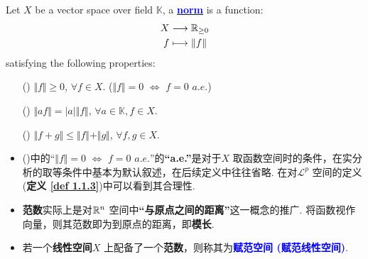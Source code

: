 	\begin{defn}\label{def 1.1.1}
		Let $X$ be a vector space over field $\mathbb{K}$, a \underline{\textcolor{blue}{\textbf{norm}}} is a function:
		\begin{align}
			X &\longrightarrow \mathbb{R}_{\geq 0} \\
			f &\longmapsto \Vert f \Vert
		\end{align}
		satisfying the following properties:
		\begin{enumerate}
			\item[(\rmnum{1})]$\Vert f \Vert \geq 0$, $\forall f \in X$. \hspace*{3em} ($\Vert f \Vert = 0 \,\, \Leftrightarrow \,\, f = 0 \,\, a.e.$)
			
			\item[(\rmnum{2})]$\Vert af \Vert = \left| a \right| \Vert f \Vert$, $\forall a \in \mathbb{K}, f \in X$.
			
			\item[(\rmnum{3})]$\Vert f + g \Vert \leq \Vert f \Vert + \Vert g \Vert$, $\forall f , g \in X$.
		\end{enumerate}
		
		\vspace{2em}
		\begin{rmk}
			\begin{itemize}
				\item ()中的“$\Vert f \Vert = 0 \,\, \Leftrightarrow \,\, f = 0 \,\, a.e.$”的\textbf{“a.e.”}是对于$X$ 取函数空间时的条件，在实分析的取等条件中基本为默认叙述，在后续定义中往往省略. 在对$\mathcal{L}^p$ 空间的定义 (\textbf{定义 \ref{def 1.1.3}})中可以看到其合理性.
				
				\vspace{1em}
				
				\item \textbf{范数}实际上是对$\mathbb{R}^n$ 空间中\textbf{“与原点之间的距离”}这一概念的推广. 将函数视作向量，则其范数即为到原点的距离，即\textbf{模长}.
				
				\vspace{1em}
				
				\item 若一个\textbf{线性空间}$X$ 上配备了一个\textbf{范数}，则称其为\textcolor{blue}{\textbf{赋范空间 (赋范线性空间)}}.
			\end{itemize}
		\end{rmk}
	\end{defn}
	
